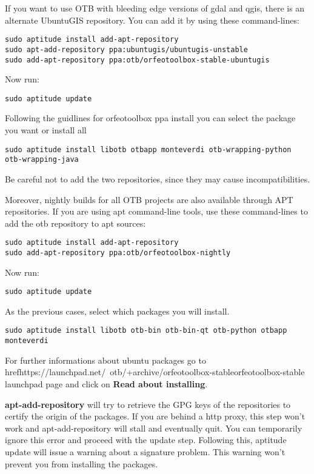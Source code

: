 If you want to use OTB with bleeding edge versions of gdal and qgis, there is an alternate UbuntuGIS repository.
You can add it by using these command-lines:
\begin{verbatim}
sudo aptitude install add-apt-repository 
sudo apt-add-repository ppa:ubuntugis/ubuntugis-unstable
sudo add-apt-repository ppa:otb/orfeotoolbox-stable-ubuntugis
\end{verbatim}
Now run:
\begin{verbatim}
sudo aptitude update
\end{verbatim}
Following the guidlines for orfeotoolbox ppa install you can select the package you want or install all
\begin{verbatim}
sudo aptitude install libotb otbapp monteverdi otb-wrapping-python otb-wrapping-java
\end{verbatim}

Be careful not to add the two repositories, since they may cause incompatibilities.

Moreover, nightly builds for all OTB projects are also available through APT repositories.
If you are using apt command-line tools, use these command-lines to add the otb repository to apt sources:
\begin{verbatim}
sudo aptitude install add-apt-repository 
sudo add-apt-repository ppa:otb/orfeotoolbox-nightly
\end{verbatim}
Now run:
\begin{verbatim}
sudo aptitude update
\end{verbatim}
As the previous cases, select which packages you will install.
\begin{verbatim}
sudo aptitude install libotb otb-bin otb-bin-qt otb-python otbapp monteverdi
\end{verbatim}

For further informations about ubuntu packages go to href{https://launchpad.net/~otb/+archive/orfeotoolbox-stable}{orfeotoolbox-stable} launchpad page and click on \textbf{Read about installing}.

\textbf{apt-add-repository} will try to retrieve the GPG keys of the repositories to certify the origin of the packages. If you are behind a http proxy, this step won't work and apt-add-repository will stall and eventually quit. You can temporarily ignore this error and proceed with the update step. Following this, aptitude update will issue a warning about a signature problem. This warning won't prevent you from installing the packages.

